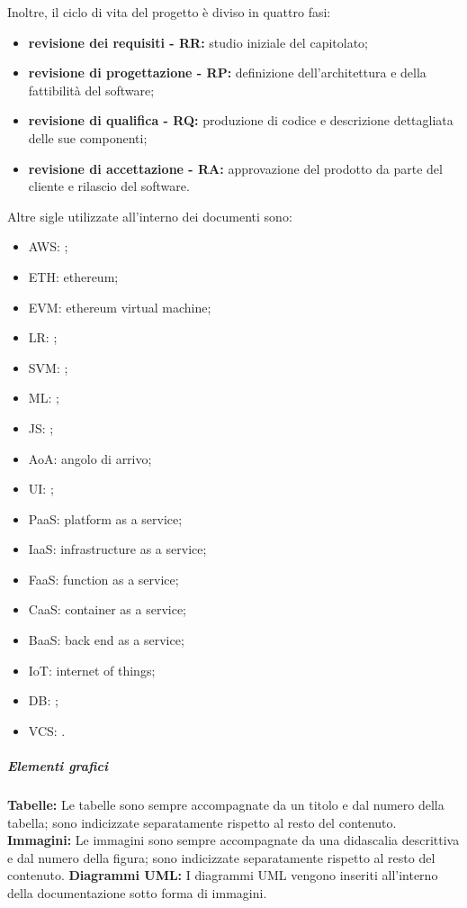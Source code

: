 					Inoltre, il ciclo di vita del progetto è diviso in quattro fasi:
					\begin{itemize}
						\item \textbf{revisione dei requisiti - RR:} studio iniziale del capitolato;
						\item \textbf{revisione di progettazione - RP:} definizione dell'architettura e della fattibilità del software;
						\item \textbf{revisione di qualifica - RQ:} produzione di codice e descrizione dettagliata delle sue componenti;
						\item \textbf{revisione di accettazione - RA:} approvazione del prodotto da parte del cliente e rilascio del software.
					\end{itemize}
					Altre sigle utilizzate all'interno dei documenti sono:
					\begin{itemize}
						\item AWS: ;
						\item ETH: ethereum;
						\item EVM: ethereum virtual machine;
						\item LR: ;
						\item SVM: ;
						\item ML: ;
						\item JS: ;
						\item AoA: angolo di arrivo;
						\item UI: ;
						\item PaaS: platform as a service;
						\item IaaS: infrastructure as a service;
						\item FaaS: function as a service;
						\item CaaS: container as a service;
						\item BaaS: back end as a service;
						\item IoT: internet of things;
						\item DB: ;
						\item VCS: .
					\end{itemize}	
			
			\subparagraph{Elementi grafici}
				\textbf{Tabelle: }
					Le tabelle sono sempre accompagnate da un titolo e dal numero della tabella; sono indicizzate separatamente rispetto al resto del contenuto.
				\textbf{Immagini: }
					Le immagini sono sempre accompagnate da una didascalia descrittiva e dal numero della figura; sono indicizzate separatamente rispetto al resto del contenuto.
				\textbf{Diagrammi UML: }
					I diagrammi UML vengono inseriti all'interno della documentazione sotto forma di immagini.	



